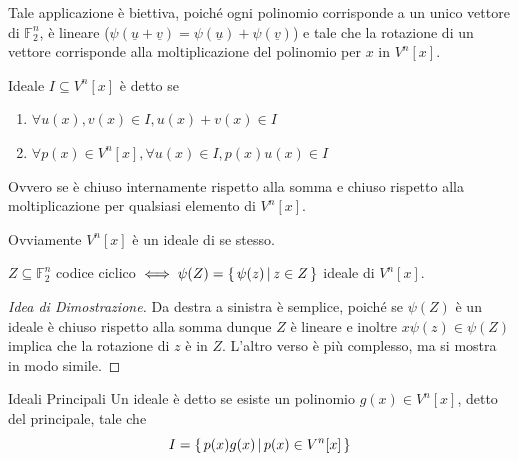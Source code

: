 Tale applicazione è biettiva, poiché ogni polinomio corrisponde a un unico vettore di \(\mathbb{F}_2^n\), è lineare (\(\psi(\underline{u} + \underline{v}) = \psi(\underline{u}) + \psi(\underline{v})\)) e tale che la rotazione di un vettore corrisponde alla moltiplicazione del polinomio per \(x\) in \(V^n[x]\).

\begin{definition}{Ideale}
  \(I \subseteq V^n[x]\) è detto  se
  \begin{enumerate}
    \item \(\forall u(x),v(x) \in I, u(x) + v(x) \in I\)
    \item \(\forall p(x) \in V^n[x], \forall u(x) \in I, p(x)u(x) \in I\)
  \end{enumerate}

  Ovvero se è chiuso internamente rispetto alla somma e chiuso rispetto alla moltiplicazione per qualsiasi elemento di \(V^n[x]\).
\end{definition}

\begin{note}{}
  Ovviamente \(V^n[x]\) è un ideale di se stesso.
\end{note}

\begin{lemma}{}
  \(Z \subseteq \mathbb{F}_2^n\) codice ciclico \(\iff\psi(Z) = \set{\psi(z)}[z\in Z]\) ideale di \(V^n[x]\).
\end{lemma}

\begin{proof}[Idea di Dimostrazione]
  Da destra a sinistra è semplice, poiché se \(\psi(Z)\) è un ideale è chiuso rispetto alla somma dunque \(Z\) è lineare e inoltre \(x\psi(z) \in \psi(Z)\) implica che la rotazione di \(z\) è in \(Z\).
  L'altro verso è più complesso, ma si mostra in modo simile.
\end{proof}

\begin{definition}{Ideali Principali}
  Un ideale è detto  se esiste un polinomio \(g(x) \in V^n[x]\), detto  del principale, tale che
  \[I = \set{p(x)g(x)}[p(x) \in V^n[x]]\]
\end{definition}


